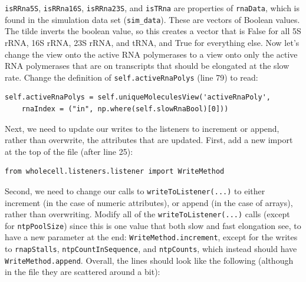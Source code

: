 \documentclass[12pt]{article}
\begin{document}
\texttt{isRRna5S}, \texttt{isRRna16S}, \texttt{isRRna23S}, and \texttt{isTRna} are properties of \texttt{rnaData}, which is found in the simulation data set (\texttt{sim\_data}). These are vectors of Boolean values. The tilde inverts the boolean value, so this creates a vector that is False for all 5S rRNA, 16S rRNA, 23S rRNA, and tRNA, and True for everything else.
Now let's change the view onto the active RNA polymerases to a view onto only the active RNA polymerases that are on transcripts that should be elongated at the slow rate. Change the definition of \texttt{self.activeRnaPolys} (line 79) to read:

\begin{lstlisting}
self.activeRnaPolys = self.uniqueMoleculesView('activeRnaPoly',
	rnaIndex = ("in", np.where(self.slowRnaBool)[0]))
\end{lstlisting}

Next, we need to update our writes to the listeners to increment or append, rather than overwrite, the attributes that are updated. First, add a new import at the top of the file (after line 25):
\begin{lstlisting}
from wholecell.listeners.listener import WriteMethod
\end{lstlisting}

Second, we need to change our calls to \texttt{writeToListener(...)} to either increment (in the case of numeric attributes), or append (in the case of arrays), rather than overwriting. Modify all of the \texttt{writeToListener(...)} calls (except for \texttt{ntpPoolSize}) since this is one value that both slow and fast elongation see, to have a new parameter at the end:  \texttt{WriteMethod.increment}, except for the writes to \texttt{rnapStalls}, \texttt{ntpCountInSequence}, and \texttt{ntpCounts}, which instead should have \texttt{WriteMethod.append}. Overall, the lines should look like the following (although in the file they are scattered around a bit):
\end{document}
